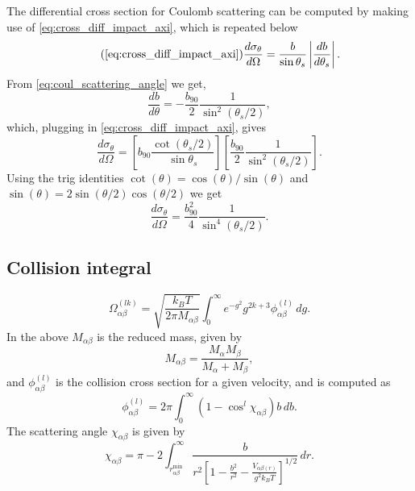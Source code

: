 \documentclass[a4paper,11pt]{report}
\begin{document}
The differential cross section for Coulomb scattering can be computed by making use of \cref{eq:cross_diff_impact_axi}, which is repeated below
\begin{equation}
    \tag{\ref{eq:cross_diff_impact_axi}}
    \frac{d\sigma_\theta}{d\Omega} = \frac{b}{\sin \theta_s} \left | \frac{db}{d\theta_s} \right |.
\end{equation}
From \cref{eq:coul_scattering_angle} we get,
\begin{equation}
    \frac{db}{d\theta} = -\frac{b_{90}}{2} \frac{1}{\sin^2 (\theta_s / 2)},
\end{equation}
which, plugging in \cref{eq:cross_diff_impact_axi}, gives
\begin{equation*}
    \frac{d\sigma_\theta}{d\Omega} = \left [ b_{90}\frac{\cot(\theta_s/2)}{\sin \theta_s} \right ] \left [ \frac{b_{90}}{2} \frac{1}{\sin^2 (\theta_s / 2)} \right ].
\end{equation*}
Using the trig identities $\cot(\theta) = \cos(\theta) / \sin(\theta)$ and $\sin(\theta) = 2 \sin(\theta/2) \cos(\theta/2)$ we get
\begin{equation}
    \frac{d\sigma_\theta}{d\Omega} = \frac{b_{90}^2}{4} \frac{1}{\sin^4 (\theta_s/2)}.
\end{equation}

\subsection{Collision integral}
\begin{equation}
    \Omega_{\alpha \beta}^{(lk)} = \sqrt{ \frac{k_B T}{2 \pi M_{\alpha \beta}} } \int_0^\infty e^{-g^2} g^{2k+3} \phi_{\alpha \beta}^{(l)} \, dg.
\end{equation}
In the above $M_{\alpha \beta}$ is the reduced mass, given by
\begin{equation}
    M_{\alpha \beta} = \frac{M_\alpha M_\beta}{M_\alpha + M_\beta},
\end{equation}
and $\phi^{(l)}_{\alpha \beta}$ is the collision cross section for a given velocity, and is computed as
\begin{equation}
    \phi_{\alpha \beta}^{(l)} = 2 \pi \int_0^\infty \left ( 1 - \cos^l \chi_{\alpha \beta} \right ) b \, db.
\end{equation}
The scattering angle $\chi_{\alpha \beta}$ is given by
\begin{equation}
    \chi_{\alpha \beta} = \pi - 2 \int_{r_{\alpha \beta}^{\text{min}}}^\infty \frac{b}{r^2 \left [ 1 - \frac{b^2}{r^2} - \frac{V_{\alpha \beta (r)}}{g^2 k_B T} \right ]^{1/2} } \, dr.
\end{equation}
\end{document}
